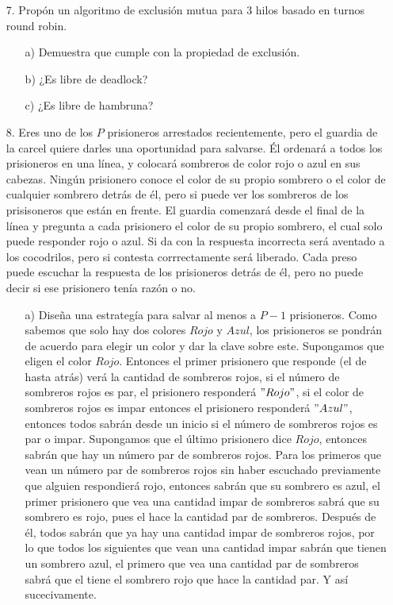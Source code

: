 \documentclass[12pt, letterpaper]{article}
\begin{document}
\begin{itemize}
\item[7. ] Propón un algoritmo de exclusión mutua para 3 hilos basado en turnos round robin.

\begin{itemize}
\item[a) ] Demuestra que cumple con la propiedad de exclusión.

\item[b) ] ¿Es libre de deadlock?

\item[c) ] ¿Es libre de hambruna?
\end{itemize}



\item[8. ] Eres uno de los $P$ prisioneros arrestados recientemente, pero el guardia de la carcel quiere darles una oportunidad para salvarse. Él ordenará a todos los prisioneros en una línea, y colocará sombreros de color rojo o azul en sus cabezas. Ningún prisionero conoce el color de su propio sombrero o el color de cualquier sombrero detrás de él, pero si puede ver los sombreros de los prisisoneros que están en frente. El guardia comenzará desde el final de la línea y pregunta a cada prisionero el color de su propio sombrero, el cual solo puede responder rojo o azul. Si da con la respuesta incorrecta será aventado a los cocodrilos, pero si contesta corrrectamente será liberado. Cada preso puede escuchar la respuesta de los prisioneros detrás de él, pero no puede decir si ese prisionero tenía razón o no.

\begin{itemize}
\item[a) ] Diseña una estrategía para salvar al menos a $P-1$ prisioneros.
Como sabemos que solo hay dos colores $Rojo$ y $Azul$, los prisioneros se pondrán de acuerdo para elegir un color y dar la clave sobre este. Supongamos que eligen el color $Rojo$. Entonces el primer prisionero que responde (el de hasta atrás) verá la cantidad de sombreros rojos, si el número de sombreros rojos es par, el prisionero responderá $"Rojo"$, si el color de sombreros rojos es impar entonces el prisionero responderá $"Azul"$, entonces todos sabrán desde un inicio si el número de sombreros rojos es par o impar. Supongamos que el último prisionero dice $Rojo$, entonces sabrán que hay un número par de sombreros rojos. Para los primeros que vean un número par de sombreros rojos sin haber escuchado previamente que alguien respondierá rojo, entonces sabrán que su sombrero es azul, el primer prisionero que vea una cantidad impar de sombreros sabrá que su sombrero es rojo, pues el hace la cantidad par de sombreros. Después de él, todos sabrán que ya hay una cantidad impar de sombreros rojos, por lo que todos los siguientes que vean una cantidad impar sabrán que tienen un sombrero azul, el primero que vea una cantidad par de sombreros sabrá que el tiene el sombrero rojo que hace la cantidad par. Y así sucecivamente.


\end{itemize}
\end{itemize}
\end{document}
